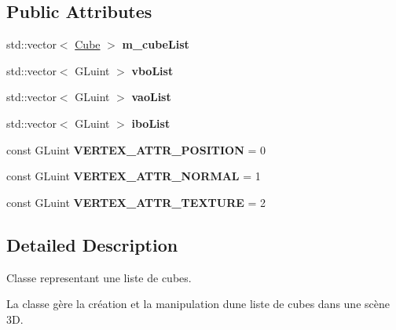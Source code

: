 \subsection*{Public Attributes}
\begin{DoxyCompactItemize}
\item 
\mbox{\label{classglimac_1_1CubeList_a571bd6927341c00bba36750788a6eda8}} 
std\+::vector$<$ \hyperlink{classglimac_1_1Cube}{Cube} $>$ {\bfseries m\+\_\+cube\+List}
\item 
\mbox{\label{classglimac_1_1CubeList_abd897d76c4194e98e406ecd276bfa67c}} 
std\+::vector$<$ G\+Luint $>$ {\bfseries vbo\+List}
\item 
\mbox{\label{classglimac_1_1CubeList_a3275ec3106283c5661d78bd5c547b5f0}} 
std\+::vector$<$ G\+Luint $>$ {\bfseries vao\+List}
\item 
\mbox{\label{classglimac_1_1CubeList_a1957da945ddd55800df7d190257db456}} 
std\+::vector$<$ G\+Luint $>$ {\bfseries ibo\+List}
\item 
\mbox{\label{classglimac_1_1CubeList_afd0c91ad6e9b8ec2d2e764d8594fd6df}} 
const G\+Luint {\bfseries V\+E\+R\+T\+E\+X\+\_\+\+A\+T\+T\+R\+\_\+\+P\+O\+S\+I\+T\+I\+ON} = 0
\item 
\mbox{\label{classglimac_1_1CubeList_a6e8ace9eaedb3df93cbb3f96ea6ad993}} 
const G\+Luint {\bfseries V\+E\+R\+T\+E\+X\+\_\+\+A\+T\+T\+R\+\_\+\+N\+O\+R\+M\+AL} = 1
\item 
\mbox{\label{classglimac_1_1CubeList_a0532ab3a5ceaa052c6f859a1e08ede62}} 
const G\+Luint {\bfseries V\+E\+R\+T\+E\+X\+\_\+\+A\+T\+T\+R\+\_\+\+T\+E\+X\+T\+U\+RE} = 2
\end{DoxyCompactItemize}


\subsection{Detailed Description}
Classe representant une liste de cubes. 

La classe gère la création et la manipulation d\textquotesingle{}une liste de cubes dans une scène 3D. 


